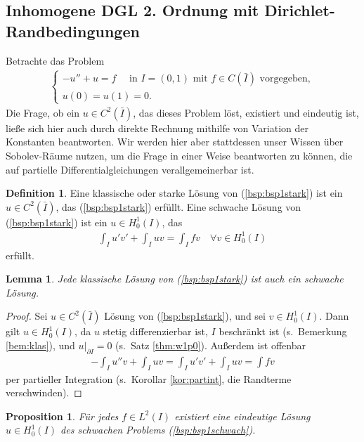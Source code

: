 \documentclass[twoside]{article}
\newtheorem{lemma}[theorem]{Lemma}
\newtheorem{proposition}[theorem]{Proposition}
\theoremstyle{definition}
\newtheorem{definition}[theorem]{Definition}
\begin{document}
\subsection{Inhomogene DGL 2. Ordnung mit Dirichlet-Randbedingungen}
Betrachte das Problem
\begin{align}
\begin{cases}
-u'' + u = f \quad \text{ in } I = (0,1) \text{ mit } f \in C(\bar{I}) \text{ vorgegeben},\\ 
u(0)=u(1)=0.
\end{cases} \label{bsp:bsp1stark}
\end{align}
Die Frage, ob ein $u \in C^2(\bar{I})$, das dieses Problem löst, existiert und eindeutig ist, ließe sich hier auch durch direkte Rechnung mithilfe von Variation der Konstanten beantworten. Wir werden hier aber stattdessen unser Wissen über Sobolev-Räume nutzen, um die Frage in einer Weise beantworten zu können, die auf partielle Differentialgleichungen verallgemeinerbar ist.
\begin{definition}
Eine klassische oder starke Lösung von (\ref{bsp:bsp1stark}) ist ein $u \in C^2(\bar{I})$, das (\ref{bsp:bsp1stark}) erfüllt. Eine schwache Lösung von (\ref{bsp:bsp1stark}) ist ein $u \in H_0^1(I)$, das 
\begin{align}
\int_I u'v' + \int_I uv = \int_I fv \quad \forall v \in H_0^1(I)  \label{bsp:bsp1schwach}
\end{align} 
erfüllt.
\end{definition}
\begin{lemma}
Jede klassische Lösung von (\ref{bsp:bsp1stark}) ist auch ein schwache Lösung.
\end{lemma}
\begin{proof}
Sei $u \in C^2(\bar{I})$ Lösung von (\ref{bsp:bsp1stark}), und sei $v \in H^1_0(I)$. Dann gilt $u \in H^1_0(I)$, da $u$ stetig differenzierbar ist, $I$ beschränkt ist (s.\ Bemerkung \ref{bem:klas}), und $u|_{\partial I}=0$ (s.\ Satz \ref{thm:w1p0}). Außerdem ist offenbar
\begin{align*}
-\int_I u'' v + \int_I uv = \int_I u' v' + \int_I uv = \int fv
\end{align*}
per partieller Integration (s.\ Korollar \ref{kor:partint}, die Randterme verschwinden).
\end{proof}
\begin{proposition} \label{prop:min}
Für jedes $f \in L^2(I)$ existiert eine eindeutige Lösung $u \in H_0^1(I)$ des schwachen Problems (\ref{bsp:bsp1schwach}).
\end{proposition}
\end{document}
